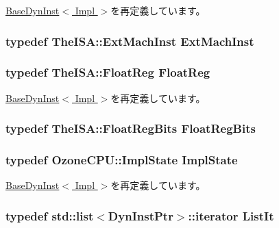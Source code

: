 \hyperlink{classBaseDynInst_a028ce10889c5f6450239d9e9a7347976}{BaseDynInst$<$ Impl $>$}を再定義しています。\hypertarget{classOzoneDynInst_a5605d4fc727eae9e595325c90c0ec108}{
\subsubsection[{ExtMachInst}]{\setlength{\rightskip}{0pt plus 5cm}typedef TheISA::ExtMachInst {\bf ExtMachInst}}}
\label{classOzoneDynInst_a5605d4fc727eae9e595325c90c0ec108}
\hypertarget{classOzoneDynInst_a75484259f1855aabc8d74c6eb1cfe186}{
\subsubsection[{FloatReg}]{\setlength{\rightskip}{0pt plus 5cm}typedef TheISA::FloatReg {\bf FloatReg}}}
\label{classOzoneDynInst_a75484259f1855aabc8d74c6eb1cfe186}


\hyperlink{classBaseDynInst_a75484259f1855aabc8d74c6eb1cfe186}{BaseDynInst$<$ Impl $>$}を再定義しています。\hypertarget{classOzoneDynInst_aab5eeae86499f9bfe15ef79360eccc64}{
\subsubsection[{FloatRegBits}]{\setlength{\rightskip}{0pt plus 5cm}typedef TheISA::FloatRegBits {\bf FloatRegBits}}}
\label{classOzoneDynInst_aab5eeae86499f9bfe15ef79360eccc64}
\hypertarget{classOzoneDynInst_af74382499244d5cf3961ff5eaf314518}{
\subsubsection[{ImplState}]{\setlength{\rightskip}{0pt plus 5cm}typedef {\bf OzoneCPU::ImplState} {\bf ImplState}}}
\label{classOzoneDynInst_af74382499244d5cf3961ff5eaf314518}


\hyperlink{classBaseDynInst_a767a9d57347239b1c904738bbd7796fa}{BaseDynInst$<$ Impl $>$}を再定義しています。\hypertarget{classOzoneDynInst_a184cb829e22cc656acb41864f68f51ea}{
\subsubsection[{ListIt}]{\setlength{\rightskip}{0pt plus 5cm}typedef {\bf std::list}$<${\bf DynInstPtr}$>$::iterator {\bf ListIt}}}
\label{classOzoneDynInst_a184cb829e22cc656acb41864f68f51ea}


